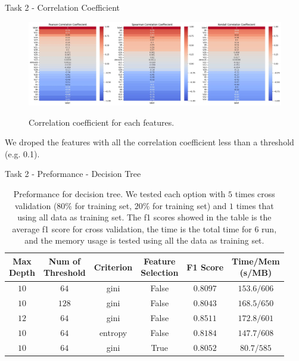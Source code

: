 \documentclass{beamer}
\begin{document}
\begin{frame}{Task 2 - Correlation Coefficient}

  \begin{figure}[H]
    \centering
    \includegraphics[width=\textwidth]{../code/Task3/Analysis/corrcoef.jpg} \\
    \caption{Correlation coefficient for each features.}
  \end{figure}

  We droped the features with all the correlation coefficient less than a threshold (e.g. 0.1).

\end{frame}

\begin{frame}{Task 2 - Preformance - Decision Tree}

  \begin{table}[H]
    \centering
    \begin{tabular}{|c|c|c|c|c|c|}
      \hline
      \makecell{Max                                           \\Depth} & \makecell{Num of                                                          \\ Threshold} & Criterion & \makecell{Feature \\ Selection}& F1 Score & \makecell{Time/Mem \\ (s/MB)}               \\
      \hline
      $10$ & $64$  & gini    & False & $0.8097$ & $153.6/606$ \\
      \hline
      $10$ & $128$ & gini    & False & $0.8043$ & $168.5/650$ \\
      \hline
      $12$ & $64$  & gini    & False & $0.8511$ & $172.8/601$ \\
      \hline
      $10$ & $64$  & entropy & False & $0.8184$ & $147.7/608$ \\
      \hline
      $10$ & $64$  & gini    & True  & $0.8052$ & $80.7/585$  \\
      \hline
    \end{tabular}
    \caption{Preformance for decision tree. We tested each option with $5$ times cross validation ($80\%$ for training set, $20\%$ for training set) and $1$ times that using all data as training set. The f1 scores showed in the table is the average f1 score for cross validation, the time is the total time for $6$ run, and the memory usage is tested using all the data as training set.}
  \end{table}

\end{frame}
\end{document}
